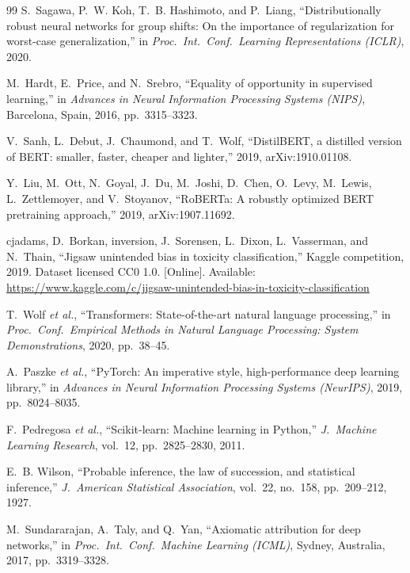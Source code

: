 \documentclass[conference]{IEEEtran}
\begin{document}
\begin{thebibliography}{99}
S.~Sagawa, P.~W. Koh, T.~B. Hashimoto, and P.~Liang, ``Distributionally robust
neural networks for group shifts: On the importance of regularization for
worst-case generalization,'' in \emph{Proc.\ Int.\ Conf.\ Learning
Representations (ICLR)}, 2020.

M.~Hardt, E.~Price, and N.~Srebro, ``Equality of opportunity in supervised
learning,'' in \emph{Advances in Neural Information Processing Systems (NIPS)},
Barcelona, Spain, 2016, pp.\ 3315--3323.

V.~Sanh, L.~Debut, J.~Chaumond, and T.~Wolf, ``DistilBERT, a distilled version of
BERT: smaller, faster, cheaper and lighter,'' 2019, arXiv:1910.01108.

Y.~Liu, M.~Ott, N.~Goyal, J.~Du, M.~Joshi, D.~Chen, O.~Levy, M.~Lewis,
L.~Zettlemoyer, and V.~Stoyanov, ``RoBERTa: A robustly optimized BERT pretraining
approach,'' 2019, arXiv:1907.11692.

cjadams, D.~Borkan, inversion, J.~Sorensen, L.~Dixon, L.~Vasserman, and
N.~Thain, ``Jigsaw unintended bias in toxicity classification,'' Kaggle
competition, 2019. Dataset licensed CC0 1.0. [Online]. Available:
\url{https://www.kaggle.com/c/jigsaw-unintended-bias-in-toxicity-classification}

T.~Wolf \emph{et al.}, ``Transformers: State-of-the-art natural language
processing,'' in \emph{Proc.\ Conf.\ Empirical Methods in Natural Language
Processing: System Demonstrations}, 2020, pp.\ 38--45.

A.~Paszke \emph{et al.}, ``PyTorch: An imperative style, high-performance deep
learning library,'' in \emph{Advances in Neural Information Processing Systems
(NeurIPS)}, 2019, pp.\ 8024--8035.

F.~Pedregosa \emph{et al.}, ``Scikit-learn: Machine learning in Python,''
\emph{J.\ Machine Learning Research}, vol.\ 12, pp.\ 2825--2830, 2011.

E.~B. Wilson, ``Probable inference, the law of succession, and statistical
inference,'' \emph{J.\ American Statistical Association}, vol.\ 22, no.\ 158,
pp.\ 209--212, 1927.

M.~Sundararajan, A.~Taly, and Q.~Yan, ``Axiomatic attribution for deep
networks,'' in \emph{Proc.\ Int.\ Conf.\ Machine Learning (ICML)}, Sydney,
Australia, 2017, pp.\ 3319--3328.

\end{thebibliography}
\end{document}
